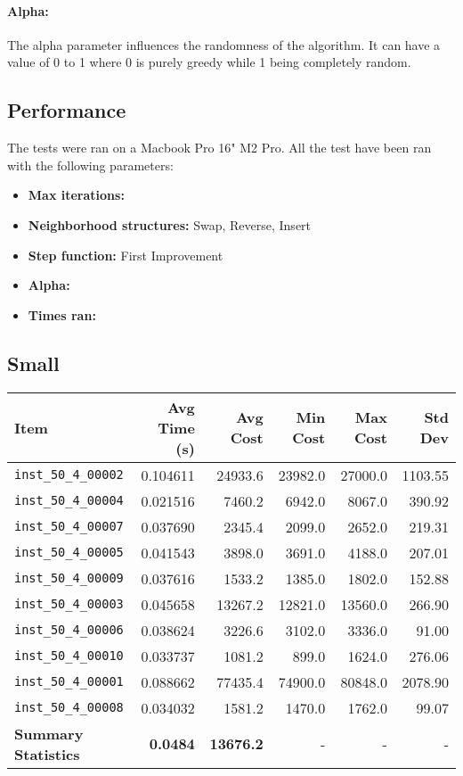 \documentclass{article}
\begin{document}
\paragraph{Alpha:}
The alpha parameter influences the randomness of the algorithm. It can have a value of 0 to 1 where 0 is purely greedy while 1 being completely random.

\subsection*{Performance}
The tests were ran on a Macbook Pro 16" M2 Pro. All the test have been ran with the following parameters: 
\begin{itemize}
	\item \textbf{Max iterations:} 
	\item \textbf{Neighborhood structures:} Swap, Reverse, Insert
	\item \textbf{Step function:} First Improvement
	\item \textbf{Alpha:} 
	\item \textbf{Times ran:} 
\end{itemize}

\subsection*{Small}
\begin{table}[H]
	\centering
	\begin{tabular}{lrrrrr}
		\toprule
		\textbf{Item} & \textbf{Avg Time (s)} & \textbf{Avg Cost} & \textbf{Min Cost} & \textbf{Max Cost} & \textbf{Std Dev} \\
		\midrule
		\texttt{inst\_50\_4\_00002} & 0.104611 & 24933.6 & 23982.0 & 27000.0 & 1103.55 \\ 
		\texttt{inst\_50\_4\_00004} & 0.021516 & 7460.2  & 6942.0  & 8067.0  & 390.92 \\ 
		\texttt{inst\_50\_4\_00007} & 0.037690 & 2345.4  & 2099.0  & 2652.0  & 219.31 \\ 
		\texttt{inst\_50\_4\_00005} & 0.041543 & 3898.0  & 3691.0  & 4188.0  & 207.01 \\ 
		\texttt{inst\_50\_4\_00009} & 0.037616 & 1533.2  & 1385.0  & 1802.0  & 152.88 \\ 
		\texttt{inst\_50\_4\_00003} & 0.045658 & 13267.2 & 12821.0 & 13560.0 & 266.90 \\ 
		\texttt{inst\_50\_4\_00006} & 0.038624 & 3226.6  & 3102.0  & 3336.0  & 91.00  \\ 
		\texttt{inst\_50\_4\_00010} & 0.033737 & 1081.2  & 899.0   & 1624.0  & 276.06 \\ 
		\texttt{inst\_50\_4\_00001} & 0.088662 & 77435.4 & 74900.0 & 80848.0 & 2078.90 \\ 
		\texttt{inst\_50\_4\_00008} & 0.034032 & 1581.2  & 1470.0  & 1762.0  & 99.07  \\ 
		\midrule
		\textbf{Summary Statistics} & \textbf{0.0484} & \textbf{13676.2} & - & - & - \\
		\bottomrule
	\end{tabular}
	\label{tab:performance_metrics_small_grasp}
\end{table}
\end{document}
